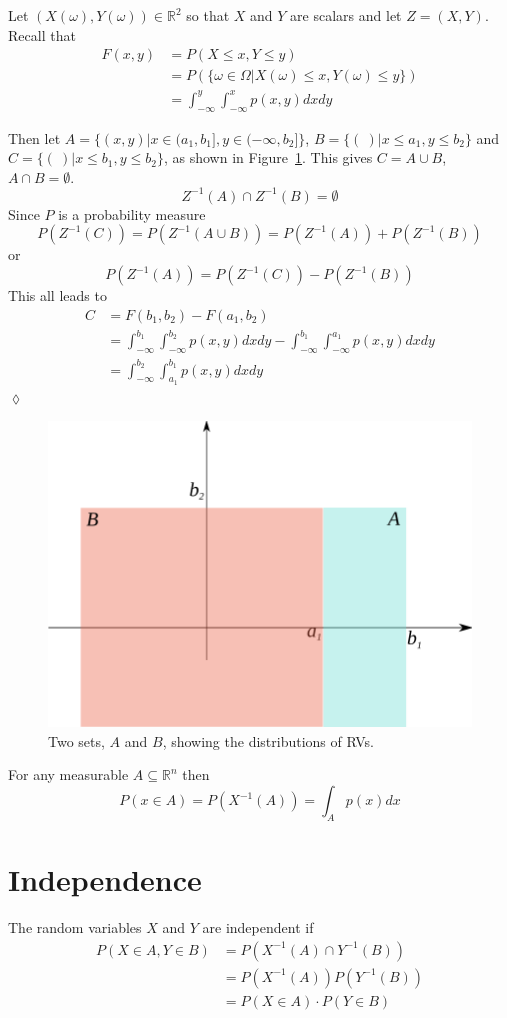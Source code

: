 \begin{example}
Let $(X(\omega),Y(\omega)) \in \mathbb{R}^2$ so that $X$ and $Y$ are scalars and let $Z=(X,Y)$.
Recall that
\begin{align*}
F(x,y) &= P(X\leq x, Y\leq y) \\
&= P(\lbrace \omega\in\Omega | X(\omega)\leq x, Y(\omega)\leq y\rbrace) \\
&= \int_{-\infty}^y\int_{-\infty}^x p(x,y)dxdy
\end{align*}

Then let $A=\lbrace(x,y) | x\in(a_1,b_1], y\in(-\infty,b_2]\rbrace$, $B=\lbrace(~) | x\leq a_1, y\leq b_2\rbrace$ and $C=\lbrace(~)|x\leq b_1, y\leq b_2\rbrace$, as shown in Figure~\ref{fig:02twoSets}.%
This gives $C=A\cup B$, $A\cap B=\emptyset$.
$$Z^{-1}(A)\cap Z^{-1}(B) = \emptyset$$
Since $P$ is a probability measure
$$P(Z^{-1}(C)) = P(Z^{-1}(A\cup B)) = P(Z^{-1}(A))+P(Z^{-1}(B))$$
or
$$P(Z^{-1}(A))=P(Z^{-1}(C))-P(Z^{-1}(B))$$
This all leads to
\begin{align*}
C &= F(b_1,b_2) - F(a_1,b_2) \\
&= \int_{-\infty}^{b_1}\int_{-\infty}^{b_2} p(x,y)dxdy - \int_{-\infty}^{b_1}\int_{-\infty}^{a_1}p(x,y)dxdy \\
&= \int_{-\infty}^{b_2}\int_{a_1}^{b_1} p(x,y)dxdy
\end{align*}
$\lozenge$
\end{example}

\begin{figure}[ht!]
\centering
\includegraphics[width=.35\textwidth]{images/02twoSets}
\caption{Two sets, $A$ and $B$, showing the distributions of RVs.}
\label{fig:02twoSets}
\end{figure}

\begin{theorem}
For any measurable $A\subseteq\mathbb{R}^n$ then
$$P(x\in A)=P(X^{-1}(A)) = \int_A p(x)dx$$
\end{theorem}

\section{Independence}
\begin{definition}
The random variables $X$ and $Y$ are independent if
\begin{align*}
P(X\in A, Y\in B) &= P(X^{-1}(A) \cap Y^{-1}(B)) \\
&= P(X^{-1}(A)) P(Y^{-1}(B)) \\
&= P(X\in A) \cdot P(Y\in B)
\end{align*}
\end{definition}

